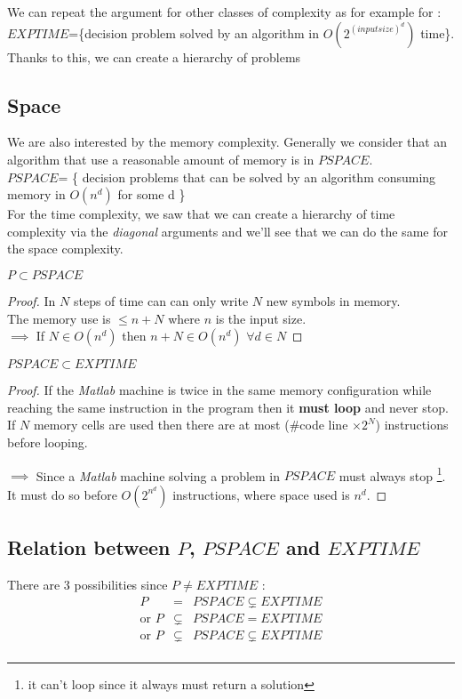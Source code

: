 We can repeat the argument for other classes of complexity as for example for :\\
$EXPTIME$=\{decision problem solved by an algorithm in $O(2^{(input size)^d})$ time\}.\\
Thanks to this, we can create a hierarchy of problems

\subsection{Space}
We are also interested by the memory complexity. Generally we consider that an algorithm that use a reasonable amount of memory is in $PSPACE$. \\
$PSPACE$= \{
decision problems that can be solved by an algorithm consuming memory in $O(n^d)$ for some d \}\\
For the time complexity, we saw that we can create a hierarchy of time complexity via the \emph{diagonal} arguments and we'll see that we can do the same for the space complexity.\\

\begin{theorem} $P \subset PSPACE$ 
\end{theorem}
\begin{proof}
In $N$ steps of time can can only write $N$ new symbols in memory. \\
The memory use is $\leq n + N$ where $n$ is the input size.\\
$\implies$ If  $N \in O(n^d)$ then $n+N\in O(n^d) $ $\forall d \in N$

\end{proof}

\begin{theorem} $PSPACE \subset EXPTIME$
\end{theorem}
\begin{proof}
If the \emph{Matlab} machine is twice in the same memory configuration while reaching
the same instruction in the program then it \textbf{must loop} and never stop.
If $N$ memory cells are used then there are at most ($\#$code line $\times 2^N$) instructions before looping.

$\implies$ Since a \emph{Matlab} machine solving a problem in $PSPACE$ must always stop \footnote{it can't loop since it always must return a solution}.
It must do so before $O(2^{n^d})$ instructions, where space used is $n^d$.
\end{proof}

\subsection{Relation between $P$, $PSPACE$ and $EXPTIME$}
There are 3 possibilities since $P \neq EXPTIME$ :
\begin{eqnarray}
P&=&PSPACE\subsetneq EXPTIME\\
\text{or }P&\subsetneq &PSPACE= EXPTIME\\
\text{or }P&\subsetneq &PSPACE\subsetneq EXPTIME\\
\end{eqnarray}

